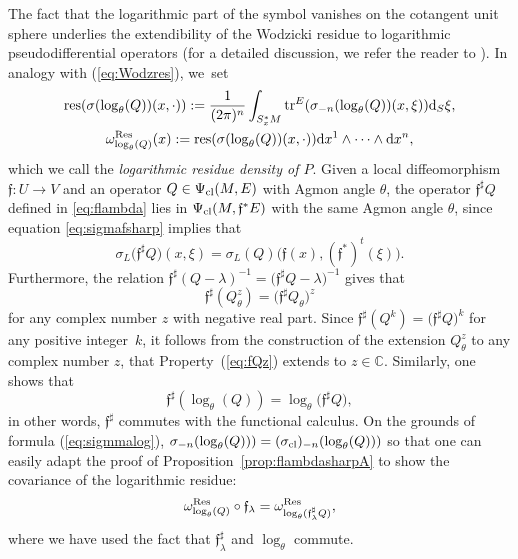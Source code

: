 \documentclass[pdftex]{sigma}
\numberwithin{equation}{section}
\theoremstyle{definition}
\newcommand{\C}{\mathbb C}
\begin{document}
The fact that the logarithmic part of the symbol vanishes on the cotangent unit sphere underlies the extendibility of the Wodzicki residue to logarithmic pseudodifferential operators (for a detailed discussion, we refer the reader to \cite[Section~2.7.1]{Sc}). In analogy with (\ref{eq:Wodzres}), we~set
\begin{gather}
{\rm res}(\sigma(\log_\theta (Q))(x,\cdot)) := \frac{1}{(2\pi)^n} \int_{S_x^*M}{\rm tr}^E(\sigma_{-n}(\log_\theta (Q)) (x, \xi)) {\rm d}_S\xi, \nonumber\\
\omega_{\log _\theta (Q)}^{\rm Res}(x) := {\rm res}(\sigma(\log_\theta (Q))(x,\cdot)) {\rm d}x^1\wedge \dots \wedge {\rm d}x^n,\label{eq:reslog}
\end{gather}
which we call the {\it logarithmic residue density of $P$}. Given a local diffeomorphism $\mathfrak{f}\colon U\to V$ and an operator $Q\in\Psi_{\rm cl}(M, E)$ with Agmon angle $\theta$, the operator $\mathfrak{f}^\sharp Q$ defined in \eqref{eq:flambda} lies in $\Psi_{\rm cl}(M, \mathfrak{f}^*E)$ with the same Agmon angle $\theta$, since equation \eqref{eq:sigmafsharp} implies that
\[
\sigma_L\bigl({\mathfrak{f}}^\sharp Q\bigr)(x, \xi)= \sigma_L(Q)\bigl(\mathfrak{f}(x), (\mathfrak{f}^*)^t (\xi)\bigr).
\]
Furthermore, the relation $\mathfrak{f}^\sharp(Q-\lambda)^{-1}=\bigl(\mathfrak{f}^\sharp Q-\lambda\bigr)^{-1}$ gives that
{\begin{equation}\label{eq:fQz}
\mathfrak{f}^\sharp(Q_\theta^z)= \bigl(\mathfrak{f}^\sharp Q_\theta\bigr)^z
\end{equation}
for any complex number $z$ with negative real part. Since $\mathfrak{f}^\sharp(Q^k)= \bigl(\mathfrak{f}^\sharp Q\bigr)^k$ for any positive integer~$k$, it follows from the construction of the extension $Q_\theta^z$ to any complex number $z$, that Property~(\ref{eq:fQz}) extends to $z\in \C$. Similarly, one shows that
\begin{equation*}
\mathfrak{f}^\sharp(\log _\theta (Q))=\log _\theta\bigl( \mathfrak{f}^\sharp Q\bigr),
\end{equation*}
in other words, $\mathfrak{f}^\sharp$ commutes with the functional calculus.} On the grounds of formula (\ref{eq:sigmmalog}), $\sigma_{-n}(\log _\theta (Q))) = (\sigma_{\rm cl})_{-n}(\log _\theta (Q)))$ so that one can easily adapt the proof of Proposition~\ref{prop:flambdasharpA} to show the covariance of the logarithmic residue:
\begin{equation}\label{eq:fReslog}
\omega_{\log_\theta (Q)}^{\rm Res}\circ{\mathfrak f}_\lambda =\omega^{\rm Res}_{ \log_\theta ({\mathfrak f}_\lambda^\sharp Q)},
\end{equation}
where we have used the fact that $\mathfrak{f}_\lambda^\sharp$ and $\log _\theta$ commute.
\end{document}
